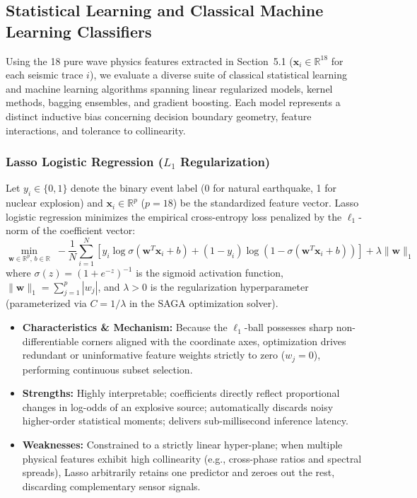 \documentclass[11pt,a4paper]{article}
\begin{document}
\subsection{Statistical Learning and Classical Machine Learning Classifiers}
Using the 18 pure wave physics features extracted in Section~5.1 ($\mathbf{x}_i \in \mathbb{R}^{18}$ for each seismic trace $i$), we evaluate a diverse suite of classical statistical learning and machine learning algorithms spanning linear regularized models, kernel methods, bagging ensembles, and gradient boosting. Each model represents a distinct inductive bias concerning decision boundary geometry, feature interactions, and tolerance to collinearity.

\subsubsection{Lasso Logistic Regression (\texorpdfstring{$L_1$}{L1} Regularization)}
Let $y_i \in \{0, 1\}$ denote the binary event label (0 for natural earthquake, 1 for nuclear explosion) and $\mathbf{x}_i \in \mathbb{R}^p$ ($p = 18$) be the standardized feature vector. Lasso logistic regression minimizes the empirical cross-entropy loss penalized by the $\ell_1$-norm of the coefficient vector:
\begin{equation*}
    \min_{\mathbf{w} \in \mathbb{R}^p, \, b \in \mathbb{R}} \; -\frac{1}{N}\sum_{i=1}^N \left[ y_i \log \sigma(\mathbf{w}^T \mathbf{x}_i + b) + (1 - y_i) \log(1 - \sigma(\mathbf{w}^T \mathbf{x}_i + b)) \right] + \lambda \|\mathbf{w}\|_1
\end{equation*}
where $\sigma(z) = (1 + e^{-z})^{-1}$ is the sigmoid activation function, $\|\mathbf{w}\|_1 = \sum_{j=1}^p |w_j|$, and $\lambda > 0$ is the regularization hyperparameter (parameterized via $C = 1/\lambda$ in the SAGA optimization solver).
\begin{itemize}\setlength{\itemsep}{1.5pt}\setlength{\parskip}{0pt}
    \item \textbf{Characteristics \& Mechanism:} Because the $\ell_1$-ball possesses sharp non-differentiable corners aligned with the coordinate axes, optimization drives redundant or uninformative feature weights strictly to zero ($w_j = 0$), performing continuous subset selection.
    \item \textbf{Strengths:} Highly interpretable; coefficients directly reflect proportional changes in log-odds of an explosive source; automatically discards noisy higher-order statistical moments; delivers sub-millisecond inference latency.
    \item \textbf{Weaknesses:} Constrained to a strictly linear hyper-plane; when multiple physical features exhibit high collinearity (e.g., cross-phase ratios and spectral spreads), Lasso arbitrarily retains one predictor and zeroes out the rest, discarding complementary sensor signals.
\end{itemize}
\end{document}
